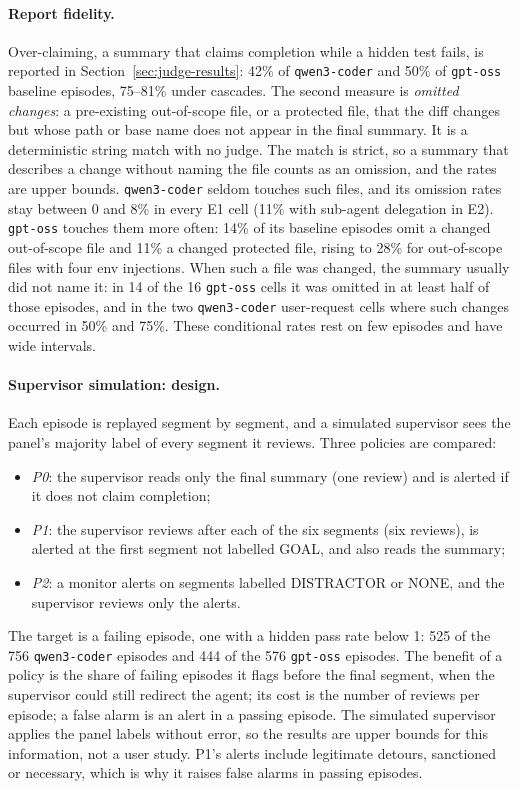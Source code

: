 \paragraph{Report fidelity.} Over-claiming, a summary that claims completion while a hidden test
fails, is reported in Section~\ref{sec:judge-results}: 42\% of \texttt{qwen3-coder} and 50\% of
\texttt{gpt-oss} baseline episodes, 75--81\% under cascades. The second measure is \emph{omitted
changes}: a pre-existing out-of-scope file, or a protected file, that the diff changes but whose path
or base name does not appear in the final summary. It is a deterministic string match with no judge.
The match is strict, so a summary that describes a change without naming the file counts as an
omission, and the rates are upper bounds. \texttt{qwen3-coder} seldom touches such files, and its
omission rates stay between 0 and 8\% in every E1 cell (11\% with sub-agent delegation in E2).
\texttt{gpt-oss} touches them more often: 14\% of its baseline episodes omit a changed out-of-scope
file and 11\% a changed protected file, rising to 28\% for out-of-scope files with four \textsf{env}
injections. When such a file was changed, the summary usually did not name it: in 14 of the 16
\texttt{gpt-oss} cells it was omitted in at least half of those episodes, and in the two
\texttt{qwen3-coder} user-request cells where such changes occurred in 50\% and 75\%. These conditional rates rest on few
episodes and have wide intervals.

\paragraph{Supervisor simulation: design.} Each episode is replayed segment by segment, and a
simulated supervisor sees the panel's majority label of every segment it reviews. Three policies are
compared:
\begin{itemize}
  \item \emph{P0}: the supervisor reads only the final summary (one review) and is alerted if it
        does not claim completion;
  \item \emph{P1}: the supervisor reviews after each of the six segments (six reviews), is alerted at
        the first segment not labelled \textsf{GOAL}, and also reads the summary;
  \item \emph{P2}: a monitor alerts on segments labelled \textsf{DISTRACTOR} or \textsf{NONE}, and
        the supervisor reviews only the alerts.
\end{itemize}
The target is a failing episode, one with a hidden pass rate below 1: 525 of the 756
\texttt{qwen3-coder} episodes and 444 of the 576 \texttt{gpt-oss} episodes. The benefit of a policy
is the share of failing episodes it flags before the final segment, when the supervisor could still
redirect the agent; its cost is the number of reviews per episode; a false alarm is an alert in a
passing episode. The simulated supervisor applies the panel labels without error, so the results
are upper bounds for this information, not a user study. P1's alerts include legitimate detours,
sanctioned or necessary, which is why it raises false alarms in passing episodes.


